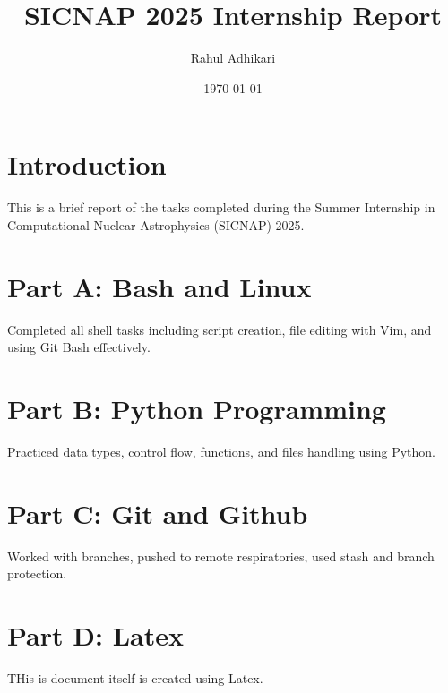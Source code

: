 \documentclass{article}
\title{SICNAP 2025 Internship Report}
\author{Rahul Adhikari}
\date{\today}
\begin{document}
\maketitle

\section{Introduction}
This is a brief report of the tasks completed during the Summer Internship in Computational Nuclear Astrophysics (SICNAP) 2025.

\section{Part A: Bash and Linux}
Completed all shell tasks including script creation, file editing with Vim, and using Git Bash effectively.

\section{Part B: Python Programming} 
Practiced data types, control flow, functions, and files handling using Python.

\section{Part C: Git and Github}
Worked with branches, pushed to remote respiratories, used stash and branch protection.

\section{Part D: Latex}
THis is document itself is created using Latex.
\end{document}
